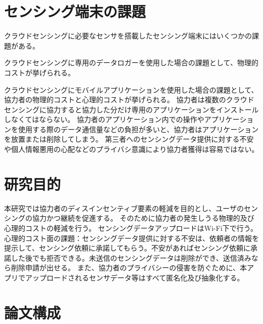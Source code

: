 \section{センシング端末の課題}

クラウドセンシングに必要なセンサを搭載したセンシング端末にはいくつかの課題がある。

クラウドセンシングに専用のデータロガーを使用した場合の課題として、物理的コストが挙げられる。

クラウドセンシングにモバイルアプリケーションを使用した場合の課題として、協力者の物理的コストと心理的コストが挙げられる。
協力者は複数のクラウドセンシングに協力すると協力した分だけ専用のアプリケーションをインストールしなくてはならない。
協力者のアプリケーション内での操作やアプリケーションを使用する際のデータ通信量などの負担が多いと、協力者はアプリケーションを放置または削除してしまう。
第三者へのセンシングデータ提供に対する不安や個人情報悪用の心配などのプライバシ意識により協力者獲得は容易ではない。

\section{研究目的}
\label{sec:thesis}

本研究では協力者のディスインセンティブ要素の軽減を目的とし、ユーザのセンシングの協力かつ継続を促進する。
そのために協力者の発生しうる物理的及び心理的コストの軽減を行う。
センシングデータアップロードはWi-Fi下で行う。
心理的コスト面の課題：センシングデータ提供に対する不安は、依頼者の情報を提示して、センシング依頼に承諾してもらう。不安があればセンシング依頼に承諾した後でも拒否できる。未送信のセンシングデータは削除ができ、送信済みなら削除申請が出せる。
また、協力者のプライバシーの侵害を防ぐために、本アプリでアップロードされるセンサデータ等はすべて匿名化及び抽象化する。


\section{論文構成}
\label{sec:presentation}



